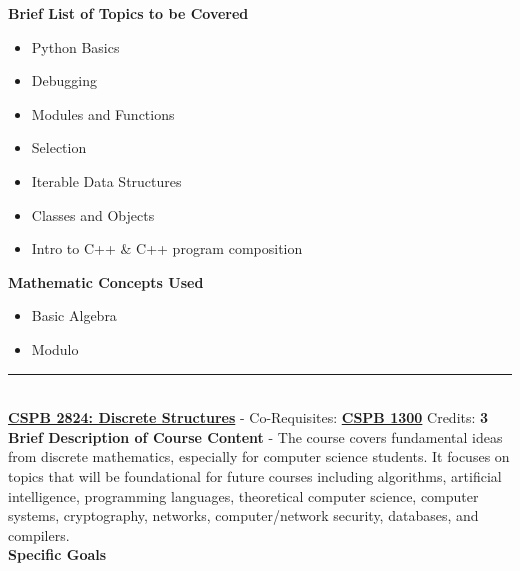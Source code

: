 \documentclass{article}
\newcommand{\horizontalline}{\noindent \rule{\textwidth}{0.5pt} \\}
\begin{document}
\noindent \textbf{Brief List of Topics to be Covered}
\begin{itemize}
    \item Python Basics
    \item Debugging
    \item Modules and Functions
    \item Selection
    \item Iterable Data Structures
    \item Classes and Objects
    \item Intro to C++ \& C++ program composition
\end{itemize}

\noindent \textbf{Mathematic Concepts Used}
\begin{itemize}
    \item Basic Algebra
    \item Modulo
\end{itemize}

\horizontalline
\noindent \href{https://www.colorado.edu/program/cspb/cspb-2824-discrete-structures}{\textbf{CSPB 2824: Discrete Structures}} - Co-Requisites: \href{https://www.colorado.edu/program/cspb/cspb-1300-computer-science-1-starting-computing}{\textbf{CSPB 1300}} Credits: \textbf{3} \\

\noindent \textbf{Brief Description of Course Content} - The course covers fundamental ideas from discrete mathematics, especially for computer science students. It focuses on topics that will be foundational for future courses including algorithms, artificial intelligence, programming languages, theoretical computer science, computer systems, cryptography, networks, computer/network security, databases, and compilers. \\

\noindent \textbf{Specific Goals} \\
\end{document}
